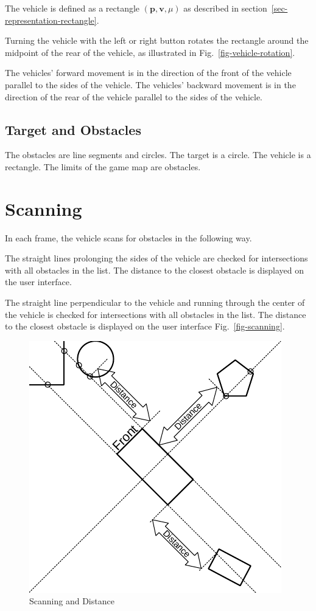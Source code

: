 \documentclass[11pt]{article}
\newcommand{\pb}{\mathbf{p}}
\newcommand{\vb}{\mathbf{v}}
\newcommand{\figref}[1]{Fig.~\eqref{#1}}
\begin{document}
The vehicle is defined as a rectangle $(\pb, \vb, \mu)$ as described in
section~\ref{sec-representation-rectangle}. 

Turning the vehicle with the left or right button rotates the rectangle
around the midpoint of the rear of the vehicle, as
illustrated in \figref{fig-vehicle-rotation}.

The vehicles' forward movement is in the direction of the front of the vehicle
parallel to the sides of the vehicle.
The vehicles' backward movement is in the direction of the rear of the vehicle
parallel to the sides of the vehicle.

\subsection{Target and Obstacles}
\label{sec-obstacles}

The obstacles are line segments and circles. The target is a circle. The
vehicle is a rectangle. The limits of the game map are obstacles.

\section{Scanning}
\label{sec-scanning}
In each frame, the vehicle scans for obstacles in the following way.

The straight lines prolonging the sides of the vehicle are checked for
intersections with all obstacles in the list. The distance to the closest
obstacle is displayed on the user interface.

The straight line perpendicular to the vehicle and running through the center
of the vehicle is checked for intersections with all obstacles in the list.
The distance to the closest obstacle is displayed on the user interface
\figref{fig-scanning}.

\begin{figure}
    \centering
    \includegraphics{odg/scanning.pdf}
    \caption{Scanning and Distance}\label{fig-scanning}
\end{figure}
\end{document}
